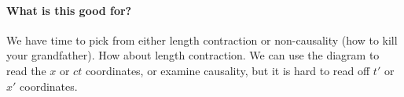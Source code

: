 \paragraph{What is this good for?}

We have time to pick from either length contraction or non-causality (how to kill your grandfather).  How about length contraction.  We can use the diagram to read the $x$ or $ct$ coordinates, or examine causality, but it is hard to read off $t'$ or $x'$ coordinates.


\EndArticle
